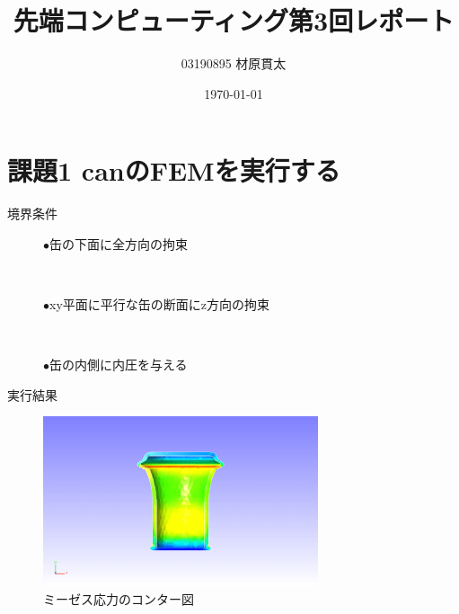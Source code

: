 \documentclass[a4paper,11pt]{jsarticle}
\begin{document}
\title{先端コンピューティング第3回レポート}
\author{03190895 材原貫太}
\date{\today}
\maketitle
\section*{課題1 canのFEMを実行する}
\begin{description}
  \item[境界条件]$\bullet$缶の下面に全方向の拘束
  \item[　　　　]$\bullet$xy平面に平行な缶の断面にz方向の拘束
  \item[　　　　]$\bullet$缶の内側に内圧を与える 
  \item[実行結果]
\end{description}
\begin{figure}[h] %
  \centering
  \includegraphics[height=5cm]{cancs_fistr_mises.png}
  \caption{ミーゼス応力のコンター図}
\end{figure}
\vspace{5cm}
\end{document}
